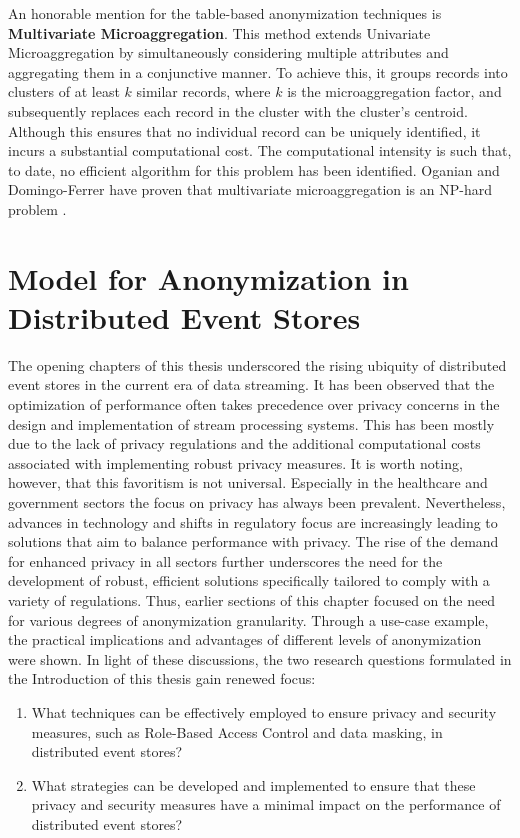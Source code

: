 An honorable mention for the table-based anonymization techniques is \textbf{Multivariate Microaggregation}. This method extends Univariate Microaggregation by simultaneously considering multiple attributes and aggregating them in a conjunctive manner. To achieve this, it groups records into clusters of at least $k$ similar records, where $k$ is the microaggregation factor, and subsequently replaces each record in the cluster with the cluster's centroid. Although this ensures that no individual record can be uniquely identified, it incurs a substantial computational cost. The computational intensity is such that, to date, no efficient algorithm for this problem has been identified. Oganian and Domingo-Ferrer have proven that multivariate microaggregation is an NP-hard problem \cite{oganian_domingo-ferrer_2001}.

\section{Model for Anonymization in Distributed Event Stores}
The opening chapters of this thesis underscored the rising ubiquity of distributed event stores in the current era of data streaming. It has been observed that the optimization of performance often takes precedence over privacy concerns in the design and implementation of stream processing systems. This has been mostly due to the lack of privacy regulations and the additional computational costs associated with implementing robust privacy measures. It is worth noting, however, that this favoritism is not universal. Especially in the healthcare and government sectors the focus on privacy has always been prevalent. Nevertheless, advances in technology and shifts in regulatory focus are increasingly leading to solutions that aim to balance performance with privacy. The rise of the demand for enhanced privacy in all sectors further underscores the need for the development of robust, efficient solutions specifically tailored to comply with a variety of regulations. Thus, earlier sections of this chapter focused on the need for various degrees of anonymization granularity. Through a use-case example, the practical implications and advantages of different levels of anonymization were shown. In light of these discussions, the two research questions formulated in the Introduction of this thesis gain renewed focus:

\begin{enumerate}
    \item What techniques can be effectively employed to ensure privacy and security measures, such as Role-Based Access Control and data masking, in distributed event stores?
    \item What strategies can be developed and implemented to ensure that these privacy and security measures have a minimal impact on the performance of distributed event stores?
\end{enumerate}

